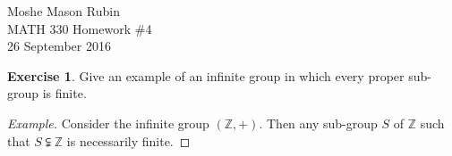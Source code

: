 \documentclass{article}
\theoremstyle{definition}
\newtheorem{theorem}{Exercise}[section]
\newcommand{\Z}{\mathbb{Z}}
\begin{document}
	\begin{flushright}
		Moshe Mason Rubin\\MATH 330 Homework \#4\\26 September 2016
	\end{flushright}
	
	
	\setcounter{theorem}{49}
	\begin{theorem}
		Give an example of an infinite group in which every proper sub-group is finite. 
	\end{theorem}
	\begin{proof}[Example]
		Consider the infinite group $\left(\Z,+\right)$. Then any sub-group $S$ of $\Z$ such that $S\subsetneqq\Z$ is necessarily finite. 
	\end{proof}
	
	
	\setcounter{theorem}{51}
\end{document}

